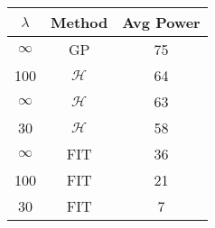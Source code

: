 \centering \begin{tabular}{c|c|c}
$\lambda$	&Method	&Avg Power\\\hline
$\infty$	&GP	&75\\
100	&$\mathcal{H}$	&64\\
$\infty$	&$\mathcal{H}$	&63\\
30	&$\mathcal{H}$	&58\\
$\infty$	&FIT	&36\\
100	&FIT	&21\\
30	&FIT	&7\\
\end{tabular}
